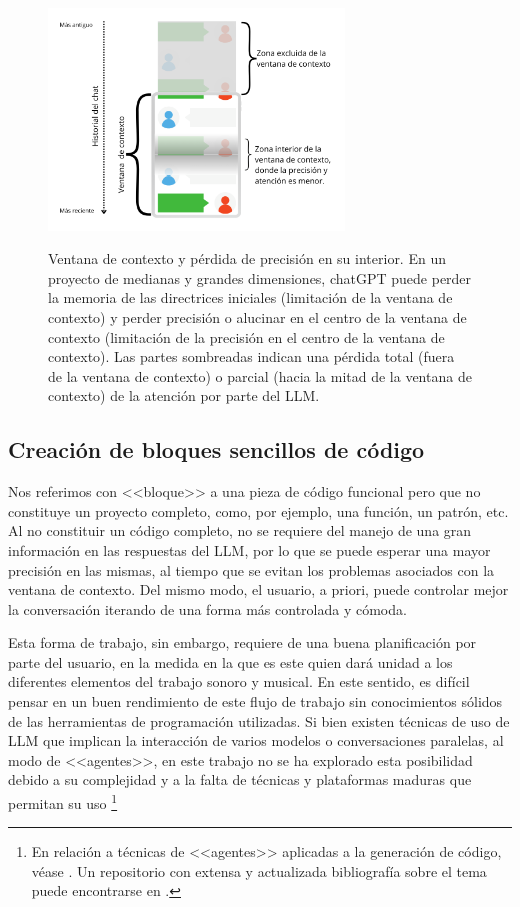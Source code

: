 \begin{figure}[h!]
    \caption[Ventana de contexto y pérdida de precisión en su interior]{Ventana de contexto y pérdida de precisión en su interior. En un proyecto de medianas y grandes dimensiones, chatGPT puede perder la memoria de las directrices iniciales (limitación de la ventana de contexto) y perder precisión o alucinar en el centro de la ventana de contexto (limitación de la precisión en el centro de la ventana de contexto). Las partes sombreadas indican una pérdida total (fuera de la ventana de contexto) o parcial (hacia la mitad de la ventana de contexto) de la atención por parte del LLM.}
    \centering
    \includegraphics[width=0.7\textwidth]{./figuras/chat_ventana_lost_in_the_middle.png}
    \label{fig:chat_ventana_lost_in_the_middle}
\end{figure}


\subsection{Creación de bloques sencillos de código}

Nos referimos con <<bloque>> a una pieza de código funcional pero que no constituye un proyecto completo, como, por ejemplo, una función, un patrón, etc. Al no constituir un código completo, no se requiere del manejo de una gran información en las respuestas del LLM, por lo que se puede esperar una mayor precisión en las mismas, al tiempo que se evitan los problemas asociados con la ventana de contexto. Del mismo modo, el usuario, a priori, puede controlar mejor la conversación iterando de una forma más controlada y cómoda. 

Esta forma de trabajo, sin embargo, requiere de una buena planificación por parte del usuario, en la medida en la que es este quien dará unidad a los diferentes elementos del trabajo sonoro y musical. En este sentido, es difícil pensar en un buen rendimiento de este flujo de trabajo sin conocimientos sólidos de las herramientas de programación utilizadas. Si bien existen técnicas de uso de LLM que implican la interacción de varios modelos o conversaciones paralelas, al modo de <<agentes>>, en este trabajo no se ha explorado esta posibilidad debido a su complejidad y a la falta de técnicas y plataformas maduras que permitan su uso \footnote{En relación a técnicas de <<agentes>> aplicadas a la generación de código, véase \cite{huangAgentCoderMultiAgentbasedCode2023}. Un repositorio con extensa y actualizada bibliografía sobre el tema puede encontrarse en \cite{AGIEdgerunnersLLMAgentsPapers2024}.}

